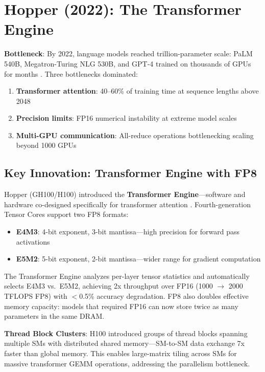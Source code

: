 \documentclass{article}
\begin{document}
\section{Hopper (2022): The Transformer Engine}

\textbf{Bottleneck}: By 2022, language models reached trillion-parameter scale: PaLM 540B, Megatron-Turing NLG 530B, and GPT-4 trained on thousands of GPUs for months \cite{chowdhery2022palm}. Three bottlenecks dominated:
\begin{enumerate}
\item \textbf{Transformer attention}: 40--60\% of training time at sequence lengths above 2048 \cite{dao2021attention}
\item \textbf{Precision limits}: FP16 numerical instability at extreme model scales
\item \textbf{Multi-GPU communication}: All-reduce operations bottlenecking scaling beyond 1000 GPUs
\end{enumerate}

\subsection{Key Innovation: Transformer Engine with FP8}

Hopper (GH100/H100) introduced the \textbf{Transformer Engine}—software and hardware co-designed specifically for transformer attention \cite{nvidia2022hopper}. Fourth-generation Tensor Cores support two FP8 formats:
\begin{itemize}
\item \textbf{E4M3}: 4-bit exponent, 3-bit mantissa—high precision for forward pass activations
\item \textbf{E5M2}: 5-bit exponent, 2-bit mantissa—wider range for gradient computation
\end{itemize}

The Transformer Engine analyzes per-layer tensor statistics and automatically selects E4M3 vs.\ E5M2, achieving 2x throughput over FP16 (1000 $\to$ 2000 TFLOPS FP8) with $<$0.5\% accuracy degradation. FP8 also doubles effective memory capacity: models that required FP16 can now store twice as many parameters in the same DRAM.

\textbf{Thread Block Clusters}: H100 introduced groups of thread blocks spanning multiple SMs with distributed shared memory—SM-to-SM data exchange 7x faster than global memory. This enables large-matrix tiling across SMs for massive transformer GEMM operations, addressing the parallelism bottleneck.
\end{document}
